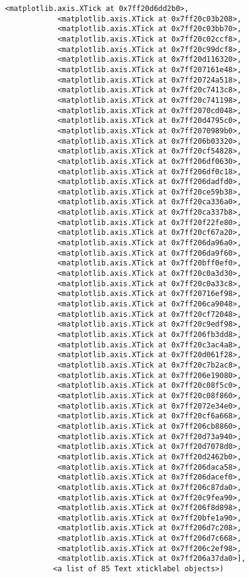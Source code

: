 \documentclass[11pt]{article}
\begin{document}
\begin{Verbatim}[commandchars=\\\{\}]
            <matplotlib.axis.XTick at 0x7ff20d6dd2b0>,
            <matplotlib.axis.XTick at 0x7ff20c03b208>,
            <matplotlib.axis.XTick at 0x7ff20c03bb70>,
            <matplotlib.axis.XTick at 0x7ff20c02ccf8>,
            <matplotlib.axis.XTick at 0x7ff20c99dcf8>,
            <matplotlib.axis.XTick at 0x7ff20d116320>,
            <matplotlib.axis.XTick at 0x7ff207161e48>,
            <matplotlib.axis.XTick at 0x7ff20724a518>,
            <matplotlib.axis.XTick at 0x7ff20c7413c8>,
            <matplotlib.axis.XTick at 0x7ff20c741198>,
            <matplotlib.axis.XTick at 0x7ff2070cd048>,
            <matplotlib.axis.XTick at 0x7ff20d4795c0>,
            <matplotlib.axis.XTick at 0x7ff2070989b0>,
            <matplotlib.axis.XTick at 0x7ff206b03320>,
            <matplotlib.axis.XTick at 0x7ff20cf54828>,
            <matplotlib.axis.XTick at 0x7ff206df0630>,
            <matplotlib.axis.XTick at 0x7ff206df0c18>,
            <matplotlib.axis.XTick at 0x7ff206dadfd0>,
            <matplotlib.axis.XTick at 0x7ff20ce59b38>,
            <matplotlib.axis.XTick at 0x7ff20ca336a0>,
            <matplotlib.axis.XTick at 0x7ff20ca337b8>,
            <matplotlib.axis.XTick at 0x7ff20f22fe80>,
            <matplotlib.axis.XTick at 0x7ff20cf67a20>,
            <matplotlib.axis.XTick at 0x7ff206da96a0>,
            <matplotlib.axis.XTick at 0x7ff206da9f60>,
            <matplotlib.axis.XTick at 0x7ff20bff0ef0>,
            <matplotlib.axis.XTick at 0x7ff20c0a3d30>,
            <matplotlib.axis.XTick at 0x7ff20c0a33c8>,
            <matplotlib.axis.XTick at 0x7ff20716ef98>,
            <matplotlib.axis.XTick at 0x7ff206ca9048>,
            <matplotlib.axis.XTick at 0x7ff20cf72048>,
            <matplotlib.axis.XTick at 0x7ff20c9edf98>,
            <matplotlib.axis.XTick at 0x7ff206fb3dd8>,
            <matplotlib.axis.XTick at 0x7ff20c3ac4a8>,
            <matplotlib.axis.XTick at 0x7ff20d061f28>,
            <matplotlib.axis.XTick at 0x7ff20c7b2ac8>,
            <matplotlib.axis.XTick at 0x7ff206e19080>,
            <matplotlib.axis.XTick at 0x7ff20c08f5c0>,
            <matplotlib.axis.XTick at 0x7ff20c08f860>,
            <matplotlib.axis.XTick at 0x7ff2072e34e0>,
            <matplotlib.axis.XTick at 0x7ff20cf6a668>,
            <matplotlib.axis.XTick at 0x7ff206cb8860>,
            <matplotlib.axis.XTick at 0x7ff20d73a940>,
            <matplotlib.axis.XTick at 0x7ff20d7078d0>,
            <matplotlib.axis.XTick at 0x7ff20d2462b0>,
            <matplotlib.axis.XTick at 0x7ff206daca58>,
            <matplotlib.axis.XTick at 0x7ff206dacef0>,
            <matplotlib.axis.XTick at 0x7ff206c87da0>,
            <matplotlib.axis.XTick at 0x7ff20c9fea90>,
            <matplotlib.axis.XTick at 0x7ff206f8d898>,
            <matplotlib.axis.XTick at 0x7ff20bfe1a90>,
            <matplotlib.axis.XTick at 0x7ff206d7c208>,
            <matplotlib.axis.XTick at 0x7ff206d7c668>,
            <matplotlib.axis.XTick at 0x7ff206c2ef98>,
            <matplotlib.axis.XTick at 0x7ff206a37da0>],
           <a list of 85 Text xticklabel objects>)
\end{Verbatim}
            
\end{document}
